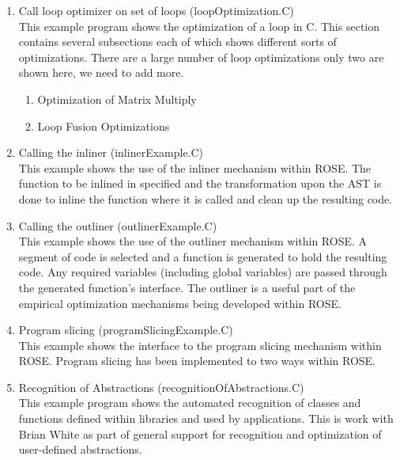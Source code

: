\begin{enumerate}

     \item Call loop optimizer on set of loops (loopOptimization.C) \\
           This example program shows the optimization of a loop in C.
           This section contains several subsections each of which shows
           different sorts of optimizations.  There are a large number of
           loop optimizations only two are shown here, we need to add more.
     \begin{enumerate}
          \item Optimization of Matrix Multiply 
          \item Loop Fusion Optimizations
     \end{enumerate}

     \item Calling the inliner (inlinerExample.C) \\
           This example shows the use of the inliner mechanism within ROSE.
           The function to be inlined in specified and the transformation upon the 
           AST is done to inline the function where it is called and clean up the
           resulting code.

     \item Calling the outliner (outlinerExample.C) \\
           This example shows the use of the outliner mechanism within ROSE.
           A segment of code is selected and a function is generated to 
           hold the resulting code.  Any required variables (including global variables)
           are passed through the generated function's interface.  The outliner is 
           a useful part of the empirical optimization mechanisms being developed 
           within ROSE.

     \item Program slicing (programSlicingExample.C) \\
           This example shows the interface to the program slicing mechanism 
           within ROSE.  Program slicing has been implemented to two ways within
           ROSE.

     \item Recognition of Abstractions (recognitionOfAbstractions.C) \\
           This example program shows the automated recognition of 
           classes and functions defined within libraries and used by 
           applications.  This is work with Brian White as part of
           general support for recognition and optimization of 
           user-defined abstractions.


\end{enumerate}
